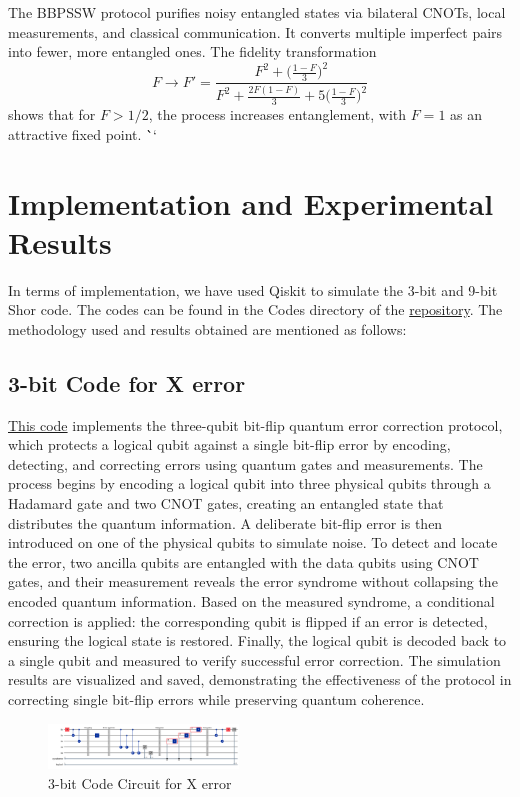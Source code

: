 \documentclass[conference]{IEEEtran}
\begin{document}
The BBPSSW protocol purifies noisy entangled states
via bilateral CNOTs, local measurements, and classical communication.
It converts multiple imperfect pairs into fewer, more entangled ones.
The fidelity transformation
\[
F \longrightarrow F' = 
\frac{F^2 + \big(\frac{1-F}{3}\big)^2}
{F^2 + \frac{2F(1-F)}{3} + 5\big(\frac{1-F}{3}\big)^2}
\]
shows that for $F>1/2$, the process increases entanglement,
with $F=1$ as an attractive fixed point.
\```


\section{Implementation and Experimental Results}
In terms of implementation, we have used Qiskit to simulate the 3-bit and 9-bit Shor code. The codes can be found in the Codes directory of the \href{https://github.com/jaymehta132/QuantumErrorCorrection-EE7001}{repository}. The methodology used and results obtained are mentioned as follows: 
\subsection{3-bit Code for X error}

\href{https://github.com/jaymehta132/QuantumErrorCorrection-EE7001/blob/main/Codes/scripts/3bitCode.py}{This code} implements the three-qubit bit-flip quantum error correction protocol, which protects a logical qubit against a single bit-flip error by encoding, detecting, and correcting errors using quantum gates and measurements. The process begins by encoding a logical qubit into three physical qubits through a Hadamard gate and two CNOT gates, creating an entangled state that distributes the quantum information. A deliberate bit-flip error is then introduced on one of the physical qubits to simulate noise. To detect and locate the error, two ancilla qubits are entangled with the data qubits using CNOT gates, and their measurement reveals the error syndrome without collapsing the encoded quantum information. Based on the measured syndrome, a conditional correction is applied: the corresponding qubit is flipped if an error is detected, ensuring the logical state is restored. Finally, the logical qubit is decoded back to a single qubit and measured to verify successful error correction. The simulation results are visualized and saved, demonstrating the effectiveness of the protocol in correcting single bit-flip errors while preserving quantum coherence.

\begin{figure}[h]
    \centering
    \includegraphics[width=0.45\textwidth]{../Codes/results/3bitCode/3bitCodeCircuit.png}
    \caption{3-bit Code Circuit for X error}
    \label{fig:3bitCodeCircuit}
\end{figure}
\end{document}
